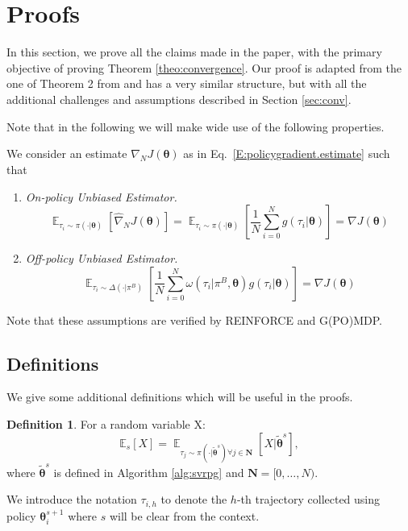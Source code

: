 \documentclass{article}
\theoremstyle{remark}
\theoremstyle{definition}
\newtheorem{definition}{Definition}[section]
\newcommand{\todopir}[1]{\todo[color=blued, inline]{\small #1}}
\DeclareMathOperator*{\EV}{\mathbb{E}}
\newcommand{\EVV}[2][\ppvect \in \ppspace]{\EV_{#1}\left[{#2}\right]}
\newcommand{\vtheta}{\boldsymbol{\theta}}
\newcommand{\Es}[1]{\mathbb{E}_{s}\left[#1\right]}
\newcommand{\wt}[1]{\widetilde{#1}}
\newcommand{\wh}[1]{\widehat{#1}}
\begin{document}



\section{Proofs}\label{app:proofs}
In this section, we prove all the claims made in the paper, with the primary objective of proving Theorem \ref{theo:convergence}.
Our proof is adapted from the one of Theorem 2 from \cite{reddi2016stochastic} and has a very similar structure, but with all the additional challenges and assumptions described in Section \ref{sec:conv}.

Note that in the following we will make wide use of the following properties.
\begin{assumption}\label{asm:unbiasedness}
        We consider an estimate $\wh{\nabla}_N J(\vtheta)$ as in Eq.~\ref{E:policygradient.estimate} such that
\begin{enumerate}
        \item \textit{On-policy Unbiased Estimator.} 
                \[
                        \EVV[\tau_i \sim \pi(\cdot|\vtheta)]{\wh{\nabla}_N J(\vtheta)} = \EVV[\tau_i \sim \pi(\cdot|\vtheta)]{\frac{1}{N} \sum_{i=0}^N g(\tau_i|\vtheta)} = \nabla J(\vtheta)
                \]
        \item \textit{Off-policy Unbiased Estimator.}
                \[
        \EVV[\tau_i \sim \Delta(\cdot|\pi^B)]{\frac{1}{N} \sum_{i=0}^N \omega(\tau_i|\pi^B,\vtheta) g(\tau_i|\vtheta) } 
        = \nabla J(\vtheta) 
                \]
\end{enumerate}
\end{assumption}
Note that these assumptions are verified by REINFORCE and G(PO)MDP.

\subsection*{Definitions}
We give some additional definitions which will be useful in the proofs.

\begin{definition}
For a random variable X:
\[
	\Es{X} = \EVV[\tau_j\sim\pi(\cdot\vert\wt{\vtheta}^s)
		\forall j\in\mathbf{N}]{X\vert\wt{\vtheta}^s},
\]
where $\wt{\vtheta}^s$ is defined in Algorithm \ref{alg:svrpg} and $\mathbf{N} = [0,\dots,N)$.
\end{definition}

We introduce the notation $\tau_{i,h}$ to denote the $h$-th trajectory collected using policy $\vtheta^{s+1}_i$ where $s$ will be clear from the context.
\end{document}
